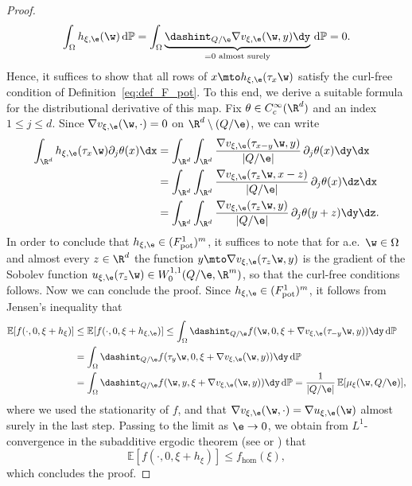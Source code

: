 \begin{proof}
\begin{equation*}
\int_{\Omega}h_{\xi,\e}(\w)\,\mathrm{d}\mathbb{P}=\int_{\Omega}\underbrace{\dashint_{Q/\e}\nabla v_{\xi,\e}(\w,y)\dy}_{=0 \text{ almost surely}}\,\mathrm{d}\mathbb{P}=0.
\end{equation*}
Hence, it suffices to show that all rows of $x\mto h_{\xi,\e}(\tau _x\w)$ satisfy the curl-free condition of Definition~\ref{eq:def_F_pot}. To this end, we derive a suitable formula for the distributional derivative of this map. Fix $\theta\in C^{\infty}_c(\R^d)$ and an index $1\leq j\leq d$. Since $\nabla v_{\xi,\e}(\w,\cdot)=0$ on $\R^d\setminus (Q/\e)$, we can write
\begin{align*}
\int_{\R^d} h_{\xi,\e}(\tau_x\w)\partial_j\theta(x)\dx&=\int_{\R^d}\int_{\R^d}\frac{\nabla v_{\xi,\e}(\tau_{x-y}\w,y)}{|Q/\e|}\,\partial_j\theta(x)\dy\dx
\\
& =\int_{\R^d}\int_{\R^d}\frac{\nabla v_{\xi,\e}(\tau_{z}\w,x-z)}{|Q/\e|}\,\partial_j\theta(x)\dz\dx\\
& =\int_{\R^d}\int_{\R^d}\frac{\nabla v_{\xi,\e}(\tau_{z}\w,y)}{|Q/\e|}\,\partial_j\theta(y+z)\dy\dz.
\end{align*}
In order to conclude that $h_{\xi,\e}\in (F_\mathrm{pot}^1)^m$, it suffices to note that for a.e.\ $\w\in\Omega$ and almost every $z\in\R^d$ the function $y\mto \nabla v_{\xi,\e}(\tau_z\w,y)$ is the gradient of the Sobolev function $u_{\xi,\e}(\tau_z\w)\in W^{1,1}_0(Q/\e,\R^m)$, so that the curl-free conditions follows. Now we can conclude the proof. Since $h_{\xi,\e}\in (F_\mathrm{pot}^1)^m$, it follows from Jensen's inequality that
\begin{align*}
\mathbb{E}[f(\cdot,0,\xi+h_{\xi})]&\leq \mathbb{E}[f(\cdot,0,\xi+h_{\xi,\e})]\leq \int_{\Omega}\dashint_{Q/\e}f(\w,0,\xi+\nabla v_{\xi,\e}(\tau_{-y}\w,y))\dy\,\mathrm{d}\mathbb{P}
\\
&=\int_{\Omega}\dashint_{Q/\e}f(\tau_{y}\w,0,\xi+\nabla v_{\xi,\e}(\w,y))\dy\,\mathrm{d}\mathbb{P}
\\
&=\int_{\Omega}\dashint_{Q/\e}f(\w,y,\xi+\nabla v_{\xi,\e}(\w,y))\dy\,\mathrm{d}\mathbb{P}
=\frac{1}{|Q/\e|}\,\mathbb{E}[\mu_{\xi}(\w,Q/\e)],
\end{align*}
where we used the stationarity of $f$, and that $\nabla v_{\xi,\e}(\w,\cdot)=\nabla u_{\xi,\e}(\w)$ almost surely in the last step. Passing to the limit as $\e\to 0$, we obtain from $L^1$-convergence in the subadditive ergodic theorem (see \cite{Smythe} or \cite[Th.\,2.3, p.\,203]{Krengel}) that
\begin{equation*}
\mathbb{E}[f(\cdot,0,\xi+h_{\xi})]\leq f_{\hom}(\xi),
\end{equation*}
which concludes the proof.
\end{proof}

